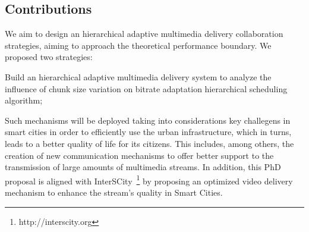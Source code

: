 \subsection*{Contributions}
\label{sec:contributions}




We aim to design an hierarchical adaptive multimedia delivery collaboration strategies, aiming to approach the theoretical
performance boundary. We proposed two strategies:

Build an hierarchical adaptive multimedia delivery system to analyze the influence of chunk size variation on bitrate adaptation hierarchical scheduling algorithm;

Such mechanisms will be deployed taking into considerations key challegens in smart cities in order to efficiently use the urban infrastructure, which in turns, leads to a better quality of life for its citizens. 
This includes, among others, the creation of new communication mechanisms to offer better support to the transmission of large amounts of multimedia streams. %
In addition, this PhD proposal is aligned with InterSCity~\footnote{http://interscity.org} by proposing an optimized video delivery mechanism to enhance the stream's quality in Smart Cities.

